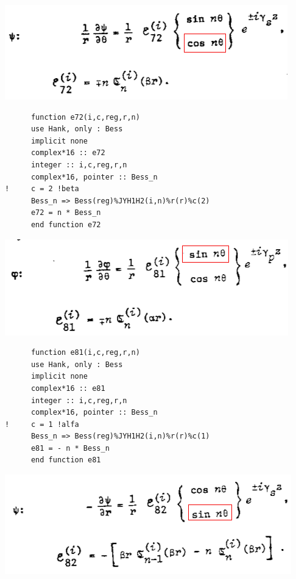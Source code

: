 \documentclass [11pt,spanish]{article}
\begin{document}
\endgroup
\includegraphics[scale=0.5]{e72}
\begingroup
\fontsize{10pt}{12pt}
\selectfont
{}
\begin{shaded}
\begin{verbatim}
      function e72(i,c,reg,r,n)
      use Hank, only : Bess
      implicit none
      complex*16 :: e72
      integer :: i,c,reg,r,n
      complex*16, pointer :: Bess_n
!     c = 2 !beta
      Bess_n => Bess(reg)%JYH1H2(i,n)%r(r)%c(2)
      e72 = n * Bess_n
      end function e72
\end{verbatim}
\end{shaded}
\endgroup
\includegraphics[scale=0.5]{e81}
\begingroup
\fontsize{10pt}{12pt}
\selectfont
{}
\begin{shaded}
\begin{verbatim}
      function e81(i,c,reg,r,n)
      use Hank, only : Bess
      implicit none
      complex*16 :: e81
      integer :: i,c,reg,r,n
      complex*16, pointer :: Bess_n
!     c = 1 !alfa
      Bess_n => Bess(reg)%JYH1H2(i,n)%r(r)%c(1)
      e81 = - n * Bess_n
      end function e81
\end{verbatim}
\end{shaded}
\endgroup
\includegraphics[scale=0.5]{e82}
\end{document}
